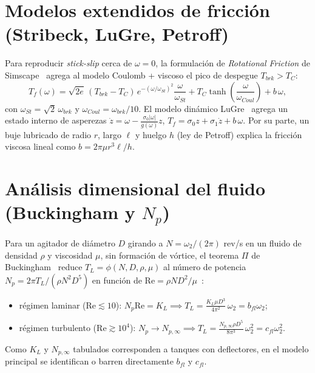 \documentclass[11pt,a4paper,oneside]{report}
\theoremstyle{definition}
\theoremstyle{remark}
\begin{document}
\section{Modelos extendidos de fricción (Stribeck, LuGre, Petroff)}\label{ap:friccion_extendida}
Para reproducir \emph{stick-slip} cerca de $\omega=0$, la formulación de
\emph{Rotational Friction} de Simscape~\cite{simscape-friction,armstrong1994}
agrega al modelo Coulomb + viscoso el pico de despegue $T_{brk} > T_C$:
\begin{equation}
  T_f(\omega) = \sqrt{2e}\,(T_{brk}-T_C)\,e^{-(\omega/\omega_{St})^2}\frac{\omega}{\omega_{St}}
              + T_C\tanh\!\left(\frac{\omega}{\omega_{Coul}}\right) + b\,\omega,
\end{equation}
con $\omega_{St}=\sqrt2\,\omega_{brk}$ y $\omega_{Coul}=\omega_{brk}/10$. El
modelo dinámico LuGre~\cite{canudas1995} agrega un estado interno de asperezas
$\dot z = \omega - \frac{\sigma_0|\omega|}{g(\omega)}z$,
$T_f=\sigma_0 z + \sigma_1\dot z + b\,\omega$. Por su parte, un buje lubricado
de radio $r$, largo $\ell$ y huelgo $h$ (ley de Petroff) explica la fricción
viscosa lineal como $b = 2\pi\mu r^3\ell/h$.

\section{Análisis dimensional del fluido (Buckingham y \texorpdfstring{$N_p$}{Np})}\label{ap:fluido_dimensional}
Para un agitador de diámetro $D$ girando a $N=\omega_2/(2\pi)$ rev/s en un
fluido de densidad $\rho$ y viscosidad $\mu$, sin formación de vórtice, el
teorema $\Pi$ de Buckingham~\cite{buckingham1914} reduce $T_L=\phi(N,D,\rho,\mu)$
al número de potencia $N_p = 2\pi T_L/(\rho N^2 D^5)$ en función de
$\mathrm{Re} = \rho N D^2/\mu$~\cite{rushton1950,paul2004,mccabe2005}:
\begin{itemize}
  \item régimen laminar ($\mathrm{Re}\lesssim 10$): $N_p\mathrm{Re}=K_L \implies
        T_L = \frac{K_L \mu D^3}{4\pi^2}\,\omega_2 = b_{fl}\omega_2$;
  \item régimen turbulento ($\mathrm{Re}\gtrsim 10^4$): $N_p\to N_{p,\infty} \implies
        T_L = \frac{N_{p,\infty}\rho D^5}{8\pi^3}\,\omega_2^2 = c_{fl}\omega_2^2$.
\end{itemize}
Como $K_L$ y $N_{p,\infty}$ tabulados corresponden a tanques con deflectores, en
el modelo principal se identifican o barren directamente $b_{fl}$ y $c_{fl}$.
\end{document}

